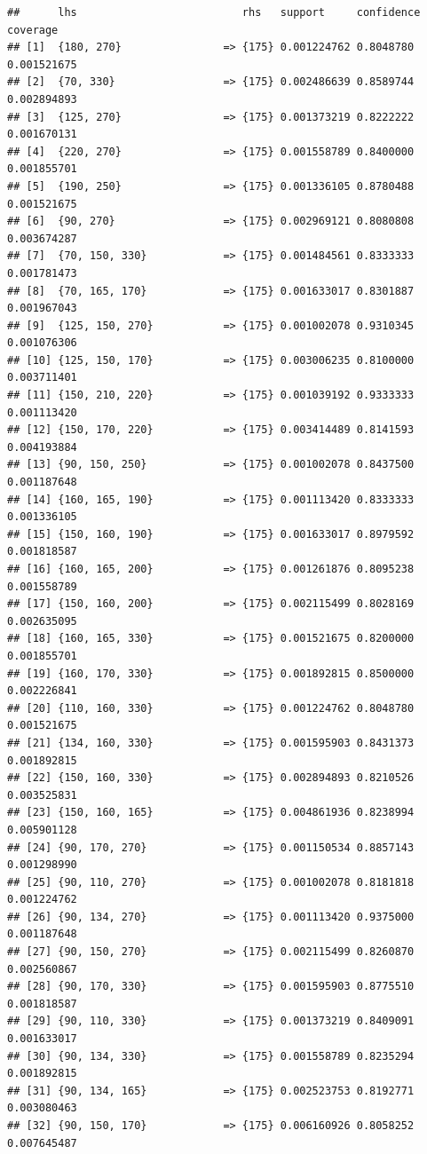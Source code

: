 \documentclass[
]{article}
\begin{document}
\begin{verbatim}
##      lhs                          rhs   support     confidence coverage   
## [1]  {180, 270}                => {175} 0.001224762 0.8048780  0.001521675
## [2]  {70, 330}                 => {175} 0.002486639 0.8589744  0.002894893
## [3]  {125, 270}                => {175} 0.001373219 0.8222222  0.001670131
## [4]  {220, 270}                => {175} 0.001558789 0.8400000  0.001855701
## [5]  {190, 250}                => {175} 0.001336105 0.8780488  0.001521675
## [6]  {90, 270}                 => {175} 0.002969121 0.8080808  0.003674287
## [7]  {70, 150, 330}            => {175} 0.001484561 0.8333333  0.001781473
## [8]  {70, 165, 170}            => {175} 0.001633017 0.8301887  0.001967043
## [9]  {125, 150, 270}           => {175} 0.001002078 0.9310345  0.001076306
## [10] {125, 150, 170}           => {175} 0.003006235 0.8100000  0.003711401
## [11] {150, 210, 220}           => {175} 0.001039192 0.9333333  0.001113420
## [12] {150, 170, 220}           => {175} 0.003414489 0.8141593  0.004193884
## [13] {90, 150, 250}            => {175} 0.001002078 0.8437500  0.001187648
## [14] {160, 165, 190}           => {175} 0.001113420 0.8333333  0.001336105
## [15] {150, 160, 190}           => {175} 0.001633017 0.8979592  0.001818587
## [16] {160, 165, 200}           => {175} 0.001261876 0.8095238  0.001558789
## [17] {150, 160, 200}           => {175} 0.002115499 0.8028169  0.002635095
## [18] {160, 165, 330}           => {175} 0.001521675 0.8200000  0.001855701
## [19] {160, 170, 330}           => {175} 0.001892815 0.8500000  0.002226841
## [20] {110, 160, 330}           => {175} 0.001224762 0.8048780  0.001521675
## [21] {134, 160, 330}           => {175} 0.001595903 0.8431373  0.001892815
## [22] {150, 160, 330}           => {175} 0.002894893 0.8210526  0.003525831
## [23] {150, 160, 165}           => {175} 0.004861936 0.8238994  0.005901128
## [24] {90, 170, 270}            => {175} 0.001150534 0.8857143  0.001298990
## [25] {90, 110, 270}            => {175} 0.001002078 0.8181818  0.001224762
## [26] {90, 134, 270}            => {175} 0.001113420 0.9375000  0.001187648
## [27] {90, 150, 270}            => {175} 0.002115499 0.8260870  0.002560867
## [28] {90, 170, 330}            => {175} 0.001595903 0.8775510  0.001818587
## [29] {90, 110, 330}            => {175} 0.001373219 0.8409091  0.001633017
## [30] {90, 134, 330}            => {175} 0.001558789 0.8235294  0.001892815
## [31] {90, 134, 165}            => {175} 0.002523753 0.8192771  0.003080463
## [32] {90, 150, 170}            => {175} 0.006160926 0.8058252  0.007645487

\end{verbatim}
\end{document}
